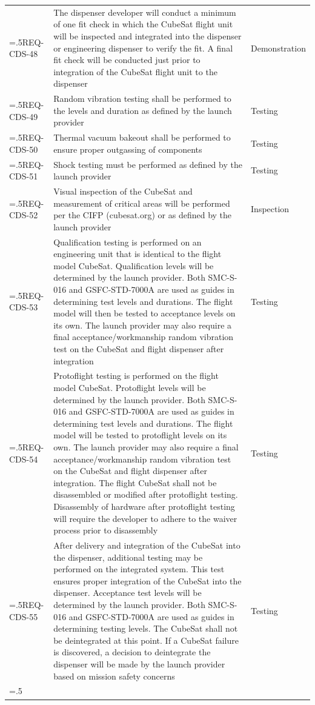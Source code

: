 \begin{tabularx}{\columnwidth}{
    >{\hsize=.5\hsize \arraybackslash}X
    >{\hsize=1.5\hsize \arraybackslash}X
    >{\centering\arraybackslash}X}
    REQ-CDS-48 &  The dispenser developer will conduct a minimum of one fit check in which the CubeSat flight unit will be inspected and integrated into the dispenser or engineering dispenser to verify the fit. A final fit check will be conducted just prior to integration of the CubeSat flight unit to the dispenser & Demonstration \\
    REQ-CDS-49 &  Random vibration testing shall be performed to the levels and duration as defined by the launch provider & Testing \\
    REQ-CDS-50 &  Thermal vacuum bakeout shall be performed to ensure proper outgassing of components & Testing \\
    REQ-CDS-51 &  Shock testing must be performed as defined by the launch provider & Testing \\
    REQ-CDS-52 &  Visual inspection of the CubeSat and measurement of critical areas will be performed per the CIFP (cubesat.org) or as defined by the launch provider & Inspection \\
    REQ-CDS-53 & Qualification testing is performed on an engineering unit that is identical to the flight model CubeSat. Qualification levels will be determined by the launch provider. Both SMC-S-016 and GSFC-STD-7000A are used as guides in determining test levels and durations. The flight model will then be tested to acceptance levels on its own. The launch provider may also require a final acceptance/workmanship random vibration test on the CubeSat and flight dispenser after integration & Testing \\
    REQ-CDS-54 & Protoflight testing is performed on the flight model CubeSat. Protoflight levels will be determined by the launch provider. Both SMC-S-016 and GSFC-STD-7000A are used as guides in determining test levels and durations. The flight model will be tested to protoflight levels on its own. The launch provider may also require a final acceptance/workmanship random vibration test on the CubeSat and flight dispenser after integration. The flight CubeSat shall not be disassembled or modified after protoflight testing. Disassembly of hardware after protoflight testing will require the developer to adhere to the waiver process prior to disassembly & Testing \\
    REQ-CDS-55 & After delivery and integration of the CubeSat into the dispenser, additional testing may be performed on the integrated system. This test ensures proper integration of the CubeSat into the dispenser. Acceptance test levels will be determined by the launch provider. Both SMC-S-016 and GSFC-STD-7000A are used as guides in determining testing levels. The CubeSat shall not be deintegrated at this point. If a CubeSat failure is discovered, a decision to deintegrate the dispenser will be made by the launch provider based on mission safety concerns & Testing \\
    \bottomrule[1.5pt]
    \caption{CubeSat Design Specification Requirements for Catarina-A1.}
    \label{tab:cubesat_requirements}
\end{tabularx}
